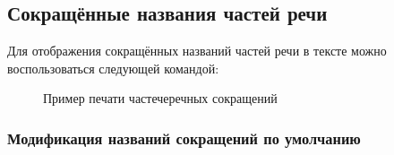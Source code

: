 \subsection{Сокращённые названия частей речи}

Для отображения сокращённых названий частей речи в тексте можно воспользоваться следующей командой:
\ExplSyntaxOn
\begin{signature}
    \manModifier[cmd] \manColon{} 
    \textasteriskcentered
    \manOpt{ \manArg[язык:tl] }
\end{signature}
\ExplSyntaxOff


\begin{figure}[H]
    \centering
    \begin{minipage}[c]{0.5\textwidth}
        \begin{Latexcode}
             
            \newline
             
            \newline
             
        \end{Latexcode}
    \end{minipage}
    \hfill
    \begin{minipage}[c]{0.4\textwidth}
        \small
         
        \newline
         
        \newline
         
    \end{minipage}

    \caption{Пример печати частечеречных сокращений}
\end{figure}


\subsubsection{Модификация названий сокращений по умолчанию}


